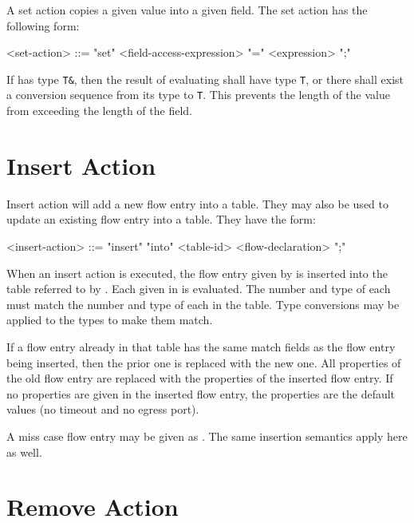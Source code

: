 A set action copies a given value into a given field. The set action has the following form:

\begin{minip}
\begin{grammar}
<set-action> ::= "set" <field-access-expression> "=" <expression> ";"
\end{grammar}
\end{minip}

If  has type \texttt{T\&}, then the result of evaluating  shall have type \texttt{T}, or there shall exist a conversion sequence from its type to \texttt{T}. This prevents the length of the value from exceeding the length of the field.

\section{Insert Action} \label{guide:insert_flow}

Insert action will add a new flow entry into a table. They may also be used to update an existing flow entry into a table. They have the form:

\begin{minip}
\begin{grammar}
<insert-action> ::= "insert" "into" <table-id> <flow-declaration> ";"
\end{grammar}
\end{minip}

When an insert action is executed, the flow entry given by  is inserted into the table referred to by . Each  given in  is evaluated. The number and type of each  must match the number and type of each  in the table. Type conversions may be applied to the types to make them match. 

If a flow entry already in that table has the same match fields as the flow entry being inserted, then the prior one is replaced with the new one. All properties of the old flow entry are replaced with the properties of the inserted flow entry. If no properties are given in the inserted flow entry, the properties are the default values (no timeout and no egress port).

A miss case flow entry may be given as . The same insertion semantics apply here as well.

\section{Remove Action} \label{guide:remove_flow}

